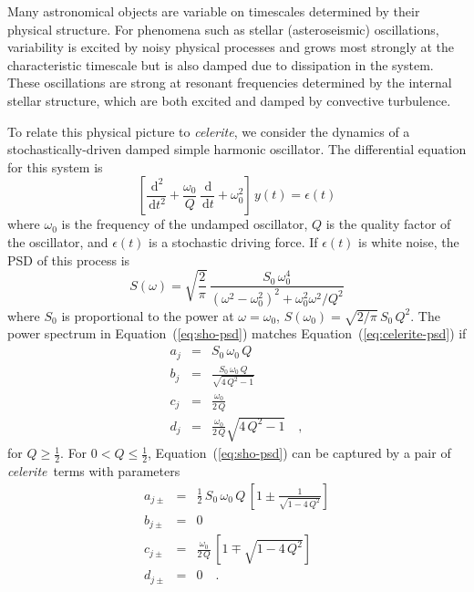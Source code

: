 \documentclass[manuscript, letterpaper]{aastex6}
\newcommand{\celeriteterm}{\emph{celerite}}
\renewcommand{\eqref}[1]{\ref{eq:#1}}
\newcommand{\Eq}[1]{Equation~(\eqref{#1})}
\newcommand{\eq}[1]{\Eq{#1}}
\newcommand{\eqlabel}[1]{\label{eq:#1}}
\newcommand{\dd}{\ensuremath{\,\mathrm{d}}}
\begin{document}
Many astronomical objects are variable on timescales determined by their
physical structure.
For phenomena such as stellar (asteroseismic) oscillations, variability is
excited by noisy physical processes and grows most strongly at the
characteristic timescale but is also damped due to dissipation in the system.
These oscillations are strong at resonant frequencies determined by the
internal stellar structure, which are both excited and damped by convective
turbulence.

To relate this physical picture to \celeriteterm, we consider the dynamics of a
stochastically-driven damped simple harmonic oscillator.
The differential equation for this system is
\begin{equation}
    \left[\frac{\dd^2}{\dd t^2} + \frac{\omega_0}{Q}\,\frac{\dd}{\dd t}
    + \omega_0^2\right]\, y(t) = \epsilon(t)
\end{equation}
where $\omega_0$ is the frequency of the undamped oscillator, $Q$ is the
quality factor of the oscillator, and $\epsilon(t)$ is a stochastic driving
force.
If $\epsilon(t)$ is white noise, the PSD of this process is
\citep{Anderson:1990}
\begin{equation}\eqlabel{sho-psd}
S(\omega) = \sqrt{\frac{2}{\pi}}\,\frac{S_0\,\omega_0^4}
    {(\omega^2-\omega_0^2)^2 + \omega_0^2\omega^2/Q^2}
\end{equation}
where $S_0$ is proportional to the power at $\omega = \omega_0$, $S(\omega_0)
= \sqrt{2/\pi}\,S_0\,Q^2$.
The power spectrum in \eq{sho-psd} matches \eq{celerite-psd} if
\begin{eqnarray}\eqlabel{sho-complex}
a_j &=& S_0\,\omega_0\,Q \\
b_j &=& \frac{S_0\,\omega_0\,Q}{\sqrt{4\,Q^2-1}} \\
c_j &=& \frac{\omega_0}{2\,Q}\\
d_j &=& \frac{\omega_0}{2\,Q} \sqrt{4\,Q^2-1} \quad,
\end{eqnarray}
for $Q \ge \frac{1}{2}$.
For $0 < Q \le \frac{1}{2}$, \eq{sho-psd} can be captured by a pair of
\celeriteterm\
terms with parameters
\begin{eqnarray}\eqlabel{sho-real}
a_{j\pm} &=& \frac{1}{2}\,S_0\,\omega_0\,Q\,\left[ 1 \pm
        \frac{1}{\sqrt{1-4\,Q^2}}\right] \\
b_{j\pm} &=& 0 \nonumber\\
    c_{j\pm} &=& \frac{\omega_0}{2\,Q}\,\left[1 \mp \sqrt{1-4\,Q^2}\right]
    \nonumber\\
d_{j\pm} &=& 0 \quad. \nonumber
\end{eqnarray}
\end{document}
